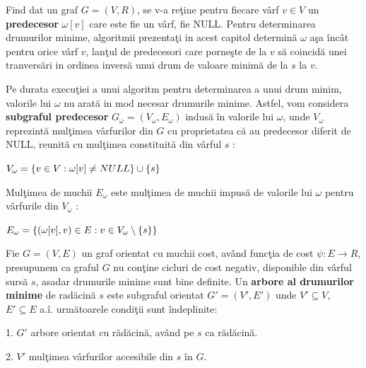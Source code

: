\documentclass[11pt,a4paper]{report}
\begin{document}
  	Find dat un graf $G=(V,R)$, se v-a re\c tine pentru fiecare v\^ arf $v\in V$ un \textbf{predecesor} $\omega[v]$ care este fie un v\^ arf, fie NULL. Pentru determinarea drumurilor minime, algoritmii prezenta\c ti in acest capitol determin\u a $\omega$ a\c sa \^ inc\^ at pentru orice v\^ arf $v$, lan\c tul de predecesori care porne\c ste de la $v$ s\u a coincid\u a unei tranvers\u ari in ordinea invers\u a unui drum de valoare minim\u a de la $s$ la $v$.
  	
  	Pe durata execu\c tiei a unui algoritm pentru determinarea a unui drum minim, valorile lui $\omega$ nu arat\u a in mod necesar drumurile minime. Astfel, vom considera \textbf{subgraful predecesor} $G_{\omega}=(V_{\omega},E_{\omega})$ indus\u a \^ in valorile lui $\omega$, unde $V_{\omega}$ reprezint\u a mul\c timea v\^ arfurilor din $G$ cu proprietatea c\u a au predecesor diferit de NULL, reunit\u a cu mul\c timea constituit\u a din v\^arful $s$ :
  	
  	\vspace{0.3cm}	
  	$\centering V_{\omega}=\left\{v\in V :\omega[v]\ne NULL\right\}\cup \left\{s\right\}$
  	\vspace{0.3cm}
  		
  	Mul\c timea de muchii $E_{\omega}$ este mul\c timea de muchii impus\u a de valorile lui $\omega$ pentru v\^ arfurile din $V_{\omega}$ :
  	
  	\vspace{0.3cm}
  	$\centering E_{\omega}=\left\{(\omega [v],v)\in E : v\in V_{\omega}\setminus \left\{s\right\}\right\}$
  	\vspace{0.3cm}
  	
  	Fie $G=(V,E)$ un graf orientat cu muchii cost, av\^ and func\c tia de cost $\psi:E \longrightarrow R$, presupunem ca graful $G$ nu con\c tine cicluri de cost negativ, disponible din v\^ arful surs\u a $s$, asadar drumurile minime sunt bine definite. Un \textbf{arbore al drumurilor minime} de rad\u acin\u a $s$ este subgraful orientat $G'=(V',E')$ unde $V'\subseteq V$, $E'\subseteq E$ a.\^ i. urm\u atoarele condi\c tii sunt \^ indeplinite:
  	
  	\vspace{0.3cm}
  	1. $G'$ arbore orientat cu r\u ad\u acin\u a, av\^ and pe $s$ ca r\u ad\u acin\u a.
  	\vspace{0.3cm}
  	
  	2. $V'$ mul\c timea v\^ arfurilor accesibile din $s$ \^ in $G$.
  	\vspace{0.3cm}
  	
\end{document}
